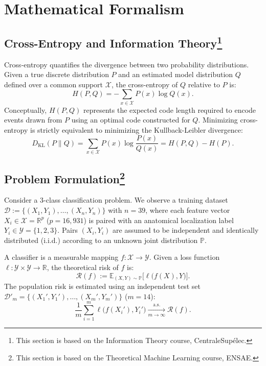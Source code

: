 \documentclass[a4paper,11pt]{paper}
\theoremstyle{plain}
\theoremstyle{definition}
\theoremstyle{remark}
\begin{document}
\newpage


\section{Mathematical Formalism}
\label{sec:formalism}

\subsection{Cross-Entropy and Information Theory\texorpdfstring{\protect\footnote{This section is based on the Information Theory course, CentraleSupélec.}}{}}

Cross-entropy quantifies the divergence between two probability distributions. Given a true discrete distribution $P$ and an estimated model distribution $Q$ defined over a common support $\mathcal{X}$, the cross-entropy of $Q$ relative to $P$ is:
$$H(P, Q) = - \sum_{x \in \mathcal{X}} P(x) \log Q(x).$$
Conceptually, $H(P,Q)$ represents the expected code length required to encode events drawn from $P$ using an optimal code constructed for $Q$. Minimizing cross-entropy is strictly equivalent to minimizing the Kullback-Leibler divergence:
$$D_{\mathrm{KL}}(P \parallel Q) = \sum_{x \in \mathcal X} P(x) \log \frac{P(x)}{Q(x)} = H(P, Q) - H(P).$$

\subsection{Problem Formulation\texorpdfstring{\protect\footnote{This section is based on the Theoretical Machine Learning course, ENSAE.}}{}}

Consider a 3-class classification problem. We observe a training dataset $\mathcal{D} := \{ (X_1, Y_1), \dots, (X_n, Y_n) \}$ with $n = 39$, where each feature vector $X_i \in \mathcal{X} = \mathbb{R}^p$ ($p = 16{,}931$) is paired with an anatomical localization label $Y_i \in \mathcal{Y} = \{1, 2, 3\}$. Pairs $(X_i, Y_i)$ are assumed to be independent and identically distributed (i.i.d.) according to an unknown joint distribution $\mathbb{P}$.

A classifier is a measurable mapping $f : \mathcal{X} \to \mathcal{Y}$. Given a loss function $\ell : \mathcal{Y} \times \mathcal{Y} \to \mathbb{R}$, the theoretical risk of $f$ is:
$$\mathcal{R}(f) := \mathbb{E}_{(X, Y) \sim \mathbb{P}} \big[ \ell\big(f(X), Y\big) \big].$$
The population risk is estimated using an independent test set $\mathcal{D}'_m = \{ (X_1', Y_1'), \dots, (X_m', Y_m') \}$ ($m = 14$):
$$\frac{1}{m}\sum_{i=1}^m \ell\big(f(X_i'), Y_i'\big) \xrightarrow[m \to \infty]{\text{a.s.}} \mathcal{R}(f).$$
\end{document}
